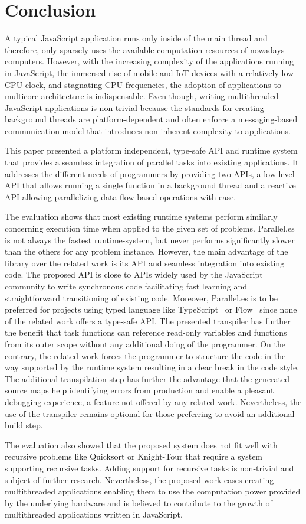 \section{Conclusion}\label{sec:conclusion}
A typical JavaScript application runs only inside of the main thread and therefore, only sparsely uses the available computation resources of nowadays computers. However, with the increasing complexity of the applications running in JavaScript, the immersed rise of mobile and IoT devices with a relatively low CPU clock, and stagnating CPU frequencies, the adoption of applications to multicore architecture is indispensable. Even though, writing multithreaded JavaScript applications is non-trivial because the standards for creating background threads are platform-dependent and often enforce a messaging-based communication model that introduces non-inherent complexity to applications.

This paper presented a platform independent, type-safe API and runtime system that provides a seamless integration of parallel tasks into existing applications. It addresses the different needs of programmers by providing two APIs, a low-level API that allows running a single function in a background thread and a reactive API allowing parallelizing data flow based operations with ease. 

The evaluation shows that most existing runtime systems perform similarly concerning execution time when applied to the given set of problems. Parallel.es is not always the fastest runtime-system, but never performs significantly slower than the others for any problem instance. However, the main advantage of the library over the related work is its API and seamless integration into existing code.  The proposed API is close to APIs widely used by the JavaScript community to write synchronous code facilitating fast learning and straightforward transitioning of existing code. Moreover, Parallel.es is to be preferred for projects using typed language like TypeScript~\cite{typescript} or Flow~\cite{flow} since none of the related work offers a type-safe API. The presented transpiler has further the benefit that task functions can reference read-only variables and functions from its outer scope without any additional doing of the programmer. On the contrary, the related work forces the programmer to structure the code in the way supported by the runtime system resulting in a clear break in the code style. The additional transpilation step has further the advantage that the generated source maps help identifying errors from production and enable a pleasant debugging experience, a feature not offered by any related work. Nevertheless, the use of the transpiler remains optional for those preferring to avoid an additional build step.

The evaluation also showed that the proposed system does not fit well with recursive problems like Quicksort or Knight-Tour that require a system supporting recursive tasks. Adding support for recursive tasks is non-trivial and subject of further research. Nevertheless, the proposed work eases creating multithreaded applications enabling them to use the computation power provided by the underlying hardware and is believed to contribute to the growth of multithreaded applications written in JavaScript. 